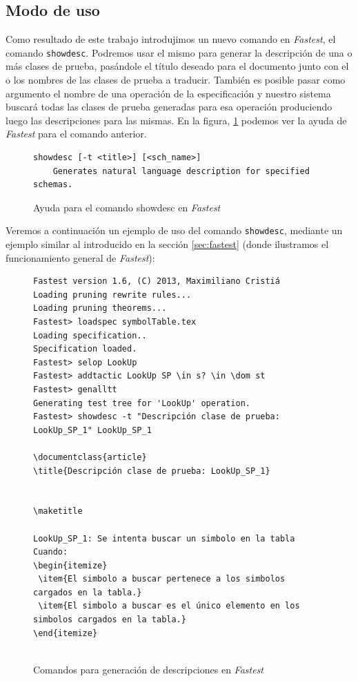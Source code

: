 \subsection{Modo de uso}

Como resultado de este trabajo introdujimos un nuevo comando en \textit{Fastest}, el comando \texttt{showdesc}. Podremos usar el mismo para generar la descripción de una o más clases de prueba, pasándole el título deseado para el documento junto con el o los nombres de las clases de prueba a traducir. También es posible pasar como argumento el nombre de una operación de la especificación y nuestro sistema buscará todas las clases de prueba generadas para esa operación produciendo luego las descripciones para las mismas. En la figura, \ref{ej:showdesc_fastest} podemos ver la ayuda de \textit{Fastest} para el comando anterior.

\begin{figure}[H]
\centering
\begin{Verbatim}[frame=single,fontsize=\scriptsize]
showdesc [-t <title>] [<sch_name>]
	Generates natural language description for specified schemas.
\end{Verbatim}
\caption{Ayuda para el comando showdesc en \emph{Fastest}}
\label{ej:showdesc_fastest}
\end{figure}

Veremos a continuación un ejemplo de uso del comando \texttt{showdesc}, mediante un ejemplo similar al introducido en la sección \ref{sec:fastest} (donde ilustramos el funcionamiento general de \textit{Fastest}):

\begin{figure}[H]
\centering
\begin{Verbatim}[frame=single,fontsize=\scriptsize]
Fastest version 1.6, (C) 2013, Maximiliano Cristiá
Loading pruning rewrite rules...
Loading pruning theorems...
Fastest> loadspec symbolTable.tex
Loading specification..
Specification loaded.
Fastest> selop LookUp
Fastest> addtactic LookUp SP \in s? \in \dom st      
Fastest> genalltt
Generating test tree for 'LookUp' operation.
Fastest> showdesc -t "Descripción clase de prueba: LookUp_SP_1" LookUp_SP_1 

\documentclass{article}
\title{Descripción clase de prueba: LookUp_SP_1}


\maketitle

LookUp_SP_1: Se intenta buscar un simbolo en la tabla
Cuando:
\begin{itemize}
 \item{El simbolo a buscar pertenece a los simbolos cargados en la tabla.}
 \item{El simbolo a buscar es el único elemento en los simbolos cargados en la tabla.}
\end{itemize}


\end{Verbatim}
\caption{Comandos para generación de descripciones en \emph{Fastest}}
\label{ej:comandos_fastest_nlg}
\end{figure}


